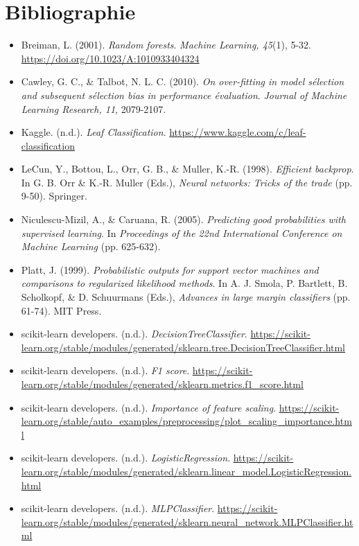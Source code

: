 \section{Bibliographie}
\sloppy

\begin{itemize}
    \item Breiman, L. (2001). \emph{Random forests}. \emph{Machine Learning, 45}(1), 5-32. \url{https://doi.org/10.1023/A:1010933404324}
    \item Cawley, G. C., \& Talbot, N. L. C. (2010). \emph{On over-fitting in model sélection and subsequent sélection bias in performance évaluation}. \emph{Journal of Machine Learning Research, 11}, 2079-2107.
    \item Kaggle. (n.d.). \emph{Leaf Classification}. \url{https://www.kaggle.com/c/leaf-classification}
    \item LeCun, Y., Bottou, L., Orr, G. B., \& Muller, K.-R. (1998). \emph{Efficient backprop}. In G. B. Orr \& K.-R. Muller (Eds.), \emph{Neural networks: Tricks of the trade} (pp. 9-50). Springer.
    \item Niculescu-Mizil, A., \& Caruana, R. (2005). \emph{Predicting good probabilities with supervised learning}. In \emph{Proceedings of the 22nd International Conference on Machine Learning} (pp. 625-632).
    \item Platt, J. (1999). \emph{Probabilistic outputs for support vector machines and comparisons to regularized likelihood methods}. In A. J. Smola, P. Bartlett, B. Scholkopf, \& D. Schuurmans (Eds.), \emph{Advances in large margin classifiers} (pp. 61-74). MIT Press.
    \item scikit-learn developers. (n.d.). \emph{DecisionTreeClassifier}. \url{https://scikit-learn.org/stable/modules/generated/sklearn.tree.DecisionTreeClassifier.html}
    \item scikit-learn developers. (n.d.). \emph{F1 score}. \url{https://scikit-learn.org/stable/modules/generated/sklearn.metrics.f1_score.html}
    \item scikit-learn developers. (n.d.). \emph{Importance of feature scaling}. \url{https://scikit-learn.org/stable/auto_examples/preprocessing/plot_scaling_importance.html}
    \item scikit-learn developers. (n.d.). \emph{LogisticRegression}. \url{https://scikit-learn.org/stable/modules/generated/sklearn.linear_model.LogisticRegression.html}
    \item scikit-learn developers. (n.d.). \emph{MLPClassifier}. \url{https://scikit-learn.org/stable/modules/generated/sklearn.neural_network.MLPClassifier.html}

\end{itemize}
